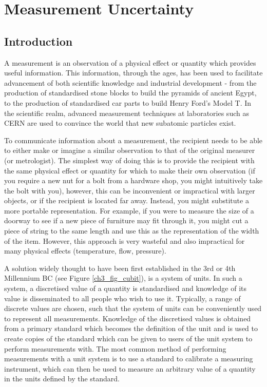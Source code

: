 \documentclass[../thesis/thesis.tex]{subfiles}
\begin{document}
	
\onlyinsubfile{\setcounter{chapter}{2}}

\chapter{Measurement Uncertainty}
\section{Introduction}

A measurement is an observation of a physical effect or quantity which provides useful information. This information, through the ages, has been used to facilitate advancement of both scientific knowledge and industrial development - from the production of standardised stone blocks to build the pyramids of ancient Egypt, to the production of standardised car parts to build Henry Ford's Model T. In the scientific realm, advanced measurement techniques at laboratories such as CERN are used to convince the world that new subatomic particles exist.

To communicate information about a measurement, the recipient needs to be able to either make or imagine a similar observation to that of the original measurer (or metrologist). The simplest way of doing this is to provide the recipient with the same physical effect or quantity for which to make their own observation (if you require a new nut for a bolt from a hardware shop, you might intuitively take the bolt with you), however, this can be inconvenient or impractical with larger objects, or if the recipient is located far away. Instead, you might substitute a more portable representation. For example, if you were to measure the size of a doorway to see if a new piece of furniture may fit through it, you might cut a piece of string to the same length and use this as the representation of the width of the item. However, this approach is very wasteful and also impractical for many physical effects (temperature, flow, pressure).

A solution widely thought to have been first established in the 3rd or 4th Millennium BC (see Figure \ref{ch3_fig_cubit}), is a system of units. In such a system, a discretised value of a quantity is standardised and knowledge of its value is disseminated to all people who wish to use it. Typically, a range of discrete values are chosen, such that the system of units can be conveniently used to represent all measurements. Knowledge of the discretised values is obtained from a primary standard which becomes the definition of the unit and is used to create copies of the standard which can be given to users of the unit system to perform measurements with. The most common method of performing measurements with a unit system is to use a standard to calibrate a measuring instrument, which can then be used to measure an arbitrary value of a quantity in the units defined by the standard.
\end{document}
